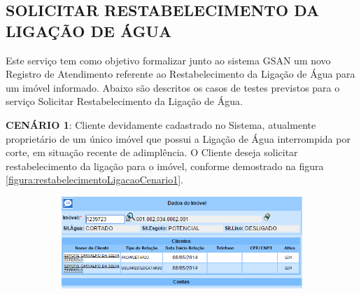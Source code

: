 \subsection{\textbf{\uppercase{Solicitar Restabelecimento da Ligação de Água}}}
Este serviço tem como objetivo formalizar junto ao sistema GSAN um novo Registro de Atendimento referente ao Restabelecimento da Ligação de Água para um imóvel informado.
Abaixo são descritos os casos de testes previstos para o serviço Solicitar Restabelecimento da Ligação de Água.
\begin{flushleft}
	\begin{description}
		\item \textbf{CENÁRIO 1}: Cliente devidamente cadastrado no Sistema, atualmente proprietário de um único imóvel que possui a Ligação de Água interrompida por corte, em situação recente de adimplência. O Cliente deseja solicitar restabelecimento da ligação para o imóvel, conforme demostrado na figura \ref{figura:restabelecimentoLigacaoCenario1}.
		\begin{figure}[H]
			\centering
			\caption{\textbf{Restabelecimento da Ligação de Água - Cenário de Teste 1}}
			\label{figura:restabelecimentoLigacaoCenario1}
			\begin{subfigure}[H]{\textwidth}
				\centering
				\includegraphics{figuras/cenarios/restabelecimento/cenario_1.PNG}
			\end{subfigure}
		\end{figure}
	\end{description}
	

\end{flushleft}
